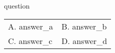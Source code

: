 \begin{question}
    {{ question }}

    \begin{tabular}{ m{0.5\linewidth} m{0.5\linewidth} }
        A. {{ answer_a }}
        &
        B. {{ answer_b }}
        \\
        C. {{ answer_c }}
        &
        D. {{ answer_d }}
        \\
    \end{tabular}
\end{question}